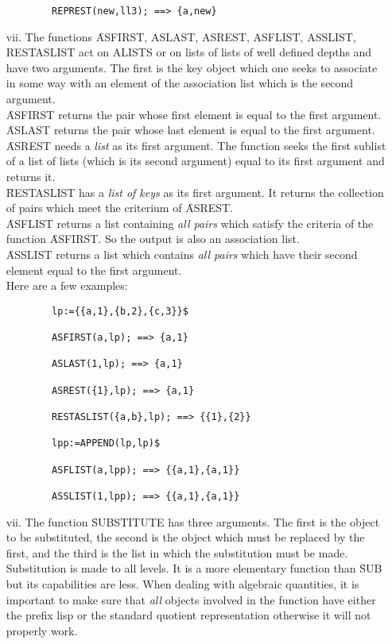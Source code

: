 \begin{itemize}
\begin{verbatim}
        REPREST(new,ll3); ==> {a,new}
\end{verbatim}
\item[vii.]
The functions \f{ASFIRST, ASLAST, ASREST, ASFLIST, ASSLIST, \\RESTASLIST}
act on ALISTS or on lists of lists of well defined depths
and have two arguments. The first is the key object
which one seeks to associate in some way with an element of the association
list which is the second argument.\\
\f{ASFIRST} returns the pair whose first element is equal to the
first argument.\\
\f{ASLAST} returns the pair whose last element is equal to the first
argument.\\
\f{ASREST} needs a {\em list} as its first argument. The function
seeks the first sublist of a list of lists (which is its second argument)
equal to its first argument and returns it.\\
\f{RESTASLIST} has a {\em list of keys} as its first argument. It
returns the collection of pairs which meet the criterium of \f{ASREST}.\\
\f{ASFLIST} returns a list containing {\em all pairs} which
satisfy the criteria of the function \f{ASFIRST}. So the output
is also an association list.\\
\f{ASSLIST} returns a list which contains {\em all pairs} which have
their second element equal to the first argument.\\
Here are a few examples:
\begin{verbatim}
        lp:={{a,1},{b,2},{c,3}}$

        ASFIRST(a,lp); ==> {a,1}

        ASLAST(1,lp); ==> {a,1}

        ASREST({1},lp); ==> {a,1}

        RESTASLIST({a,b},lp); ==> {{1},{2}}

        lpp:=APPEND(lp,lp)$

        ASFLIST(a,lpp); ==> {{a,1},{a,1}}

        ASSLIST(1,lpp); ==> {{a,1},{a,1}}
\end{verbatim}
\item[vii.] The function \f{SUBSTITUTE} has three arguments. The first
is the object to be substituted, the second is the object which must be
replaced by the first, and the third is the list in which the substitution 
must be made. Substitution is made to
all levels. It is a more elementary function than \f{SUB} but its
capabilities are less. When dealing with algebraic quantities, it is
important to make sure that {\em all} objects involved in the function
have either the prefix lisp or the standard quotient representation
otherwise it will not properly work.
\end{itemize}
